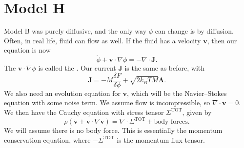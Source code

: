 \documentclass[a4paper]{article}
\begin{document}
\section{Model H}
Model B was purely diffusive, and the only way $\phi$ can change is by diffusion. Often, in real life, fluid can flow as well. If the fluid has a velocity $\mathbf{v}$, then our equation is now
\[
  \dot{\phi} + \mathbf{v} \cdot \nabla \phi = - \nabla \cdot \mathbf{J}.
\]
The $\mathbf{v} \cdot \nabla \phi$ is called the . Our current $\mathbf{J}$ is the same as before, with
\[
  \mathbf{J} = -M \frac{\delta F}{\delta \phi} + \sqrt{2k_B T M} \boldsymbol\Lambda.
\]
We also need an evolution equation for $\mathbf{v}$, which will be the Navier--Stokes equation with some noise term. We assume flow is incompressible, so $\nabla \cdot \mathbf{v} = 0$. We then have the Cauchy equation with stress tensor $\Sigma^{\mathrm{TOT}}$, given by
\[
  \rho(\dot{\mathbf{v}} + \mathbf{v} \cdot \nabla \mathbf{v}) = \nabla \cdot \Sigma^{\mathrm{TOT}} + \text{body forces}.
\]
We will assume there is no body force. This is essentially the momentum conservation equation, where $- \Sigma^{\mathrm{TOT}}$ is the momentum flux tensor.
\end{document}
